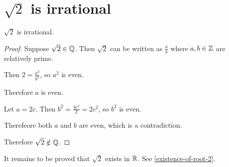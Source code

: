 \section{$\sqrt{2}$ is irrational}
\begin{theorem*}
  $\sqrt{2}$ is irrational.
\end{theorem*}

\begin{proof}
  Suppose $\sqrt{2} \in \mathbb{Q}$. Then $\sqrt{2}$ can be written as $\frac{a}{b}$ where $a, b \in \mathbb{Z}$ are relatively prime.

  Then $2 = \frac{a^2}{b^2}$, so $a^2$ is even.

  Therefore $a$ is even.

  Let $a = 2c$. Then $b^2 = \frac{4c^2}{2} = 2c^2$, so $b^2$ is even.

  Therefeore both $a$ and $b$ are even, which is a contradiction.

  Therefore $\sqrt{2} \notin \mathbb{Q}$.
\end{proof}

\begin{remark*}
  It remains to be proved that $\sqrt{2}$ exists in $\mathbb{R}$. See \ref{existence-of-root-2}.
\end{remark*}

